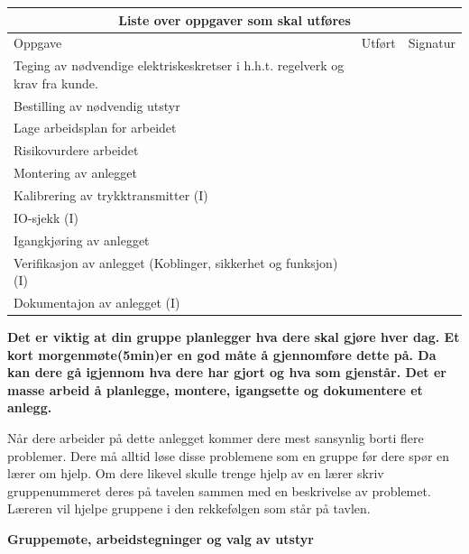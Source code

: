 \begin{center}
\begin{tabular}{ | m{8cm} | m{1cm}| m{2cm} | } 
\hline
\multicolumn{3}{|c|}{Liste over oppgaver som skal utføres} \\
\hline
Oppgave	& Utført & Signatur \\ 
\hline
\hline
	Teging av nødvendige elektriskeskretser i h.h.t. regelverk og krav fra kunde. 	& & \\ 
	\hline
	Bestilling av nødvendig utstyr	&&\\
	\hline
	Lage arbeidsplan for arbeidet &&\\
	\hline
	Risikovurdere arbeidet&&\\
	\hline
	Montering av anlegget&&\\
	\hline
	Kalibrering av trykktransmitter (I)&&\\
	\hline
	IO-sjekk (I)&&\\
	\hline
	Igangkjøring av anlegget&&\\
	\hline
	Verifikasjon av anlegget (Koblinger, sikkerhet og funksjon) (I) &&\\
	\hline
	Dokumentajon av anlegget (I)&&\\
	\hline
\end{tabular}
\end{center}


\vskip 10pt
{\bf Det er viktig at din gruppe planlegger hva dere skal gjøre hver dag. Et kort morgenmøte(5min)er en god måte å gjennomføre dette på. Da kan dere gå igjennom hva dere har gjort og hva som gjenstår. Det er masse arbeid å planlegge, montere, igangsette og dokumentere et anlegg.}

\vskip 10pt
Når dere arbeider på dette anlegget kommer dere mest sansynlig borti flere problemer. Dere må alltid løse disse problemene som en gruppe før dere spør en lærer om hjelp. Om dere likevel skulle trenge hjelp av en lærer skriv gruppenummeret deres på tavelen sammen med en beskrivelse av problemet. Læreren vil hjelpe gruppene i den rekkefølgen som står på tavlen. 





\vfil \eject

\noindent
{\bf Gruppemøte, arbeidstegninger og valg av utstyr }

\vskip 5pt


